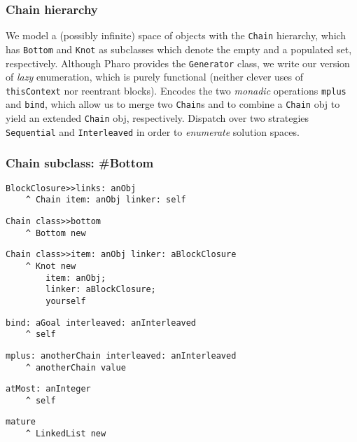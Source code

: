 \documentclass{beamer}
\begin{document}
\begin{frame}[fragile]
\frametitle{Chain hierarchy}
We model a (possibly infinite) space of objects with the
\verb|Chain| hierarchy, which has \verb|Bottom| and \verb|Knot|
as subclasses which denote the empty and a populated set, respectively.
\vfill
Although Pharo provides the \verb|Generator| class, we write our version of
\textit{lazy} enumeration, which is purely functional (neither clever uses of
\verb|thisContext| nor reentrant blocks).
\vfill
Encodes the two \textit{monadic} operations \verb|mplus| and \verb|bind|,
which allow us to merge two \verb|Chain|s and to combine a \verb|Chain| obj
to yield an extended \verb|Chain| obj, respectively.
\vfill
Dispatch over two strategies \verb|Sequential| and \verb|Interleaved| in
order to \textit{enumerate} solution spaces.
\end{frame}

\begin{frame}[fragile]
\frametitle{Chain subclass: \#Bottom}

\begin{verbatim}
BlockClosure>>links: anObj
    ^ Chain item: anObj linker: self
\end{verbatim}
\begin{verbatim}
Chain class>>bottom
    ^ Bottom new
\end{verbatim}
\begin{verbatim}
Chain class>>item: anObj linker: aBlockClosure
    ^ Knot new
        item: anObj;
        linker: aBlockClosure;
        yourself
\end{verbatim}
\begin{verbatim}
bind: aGoal interleaved: anInterleaved
    ^ self
\end{verbatim}
\begin{verbatim}
mplus: anotherChain interleaved: anInterleaved
    ^ anotherChain value
\end{verbatim}
\begin{verbatim}
atMost: anInteger
    ^ self
\end{verbatim}
\begin{verbatim}
mature
    ^ LinkedList new
\end{verbatim}
\end{frame}
\end{document}
